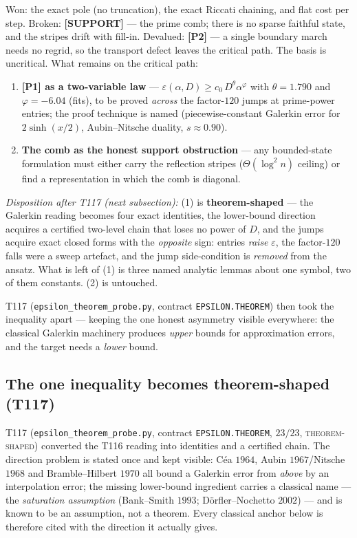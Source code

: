 \documentclass[11pt,a4paper]{article}
\begin{document}
\begin{keybox}
Won: the exact pole (no truncation), the exact Riccati chaining, and flat cost per step.
Broken: \textbf{[SUPPORT]} --- the prime comb; there is no sparse faithful state, and the
stripes drift with fill-in. Devalued: \textbf{[P2]} --- a single boundary march needs no regrid,
so the transport defect leaves the critical path. The basis is uncritical. What remains on the
critical path:
\begin{enumerate}[leftmargin=1.6em]
\item[\textbf{(1)}] \textbf{[P1] as a two-variable law} ---
$\varepsilon(\alpha,D)\ge c_0\,D^{\theta}\alpha^{\varphi}$ with $\theta=1.790$ and
$\varphi=-6.04$ (fits), to be proved \emph{across} the factor-$120$ jumps at prime-power
entries; the proof technique is named (piecewise-constant Galerkin error for $2\sinh(x/2)$,
Aubin--Nitsche duality, $s\approx0.90$).
\item[\textbf{(2)}] \textbf{The comb as the honest support obstruction} --- any bounded-state
formulation must either carry the reflection stripes ($\Theta(\log^2 n)$ ceiling) or find a
representation in which the comb is diagonal.
\end{enumerate}
\emph{Disposition after T117 (next subsection):} (1) is \textbf{theorem-shaped} --- the Galerkin
reading becomes four exact identities, the lower-bound direction acquires a certified two-level
chain that loses no power of $D$, and the jumps acquire exact closed forms with the
\emph{opposite} sign: entries \emph{raise} $\varepsilon$, the factor-$120$ falls were a sweep
artefact, and the jump side-condition is \emph{removed} from the ansatz. What is left of (1) is
three named analytic lemmas about one symbol, two of them constants. (2) is untouched.
\end{keybox}

\noindent T117 (\texttt{epsilon\_theorem\_probe.py}, contract \texttt{EPSILON.THEOREM}) then took
the inequality apart --- keeping the one honest asymmetry visible everywhere: the classical
Galerkin machinery produces \emph{upper} bounds for approximation errors, and the target needs a
\emph{lower} bound.

\subsection{The one inequality becomes theorem-shaped (T117)}
T117 (\texttt{epsilon\_theorem\_probe.py}, contract \texttt{EPSILON.THEOREM}, $23/23$,
\textsc{theorem-shaped}) converted the T116 reading into identities and a certified chain. The
direction problem is stated once and kept visible: C\'ea $1964$, Aubin $1967$/Nitsche $1968$ and
Bramble--Hilbert $1970$ all bound a Galerkin error from \emph{above} by an interpolation error;
the missing lower-bound ingredient carries a classical name --- the \emph{saturation assumption}
(Bank--Smith $1993$; D\"orfler--Nochetto $2002$) --- and is known to be an assumption, not a
theorem. Every classical anchor below is therefore cited with the direction it actually gives.
\end{document}
